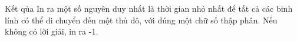 Kết qủa  
In ra một số nguyên duy nhất là thời gian nhỏ nhất để tất cả các binh lính có thể di chuyển đến một thủ đô, với đúng một chữ số thập phân. Nếu không có lời giải, in ra -1.